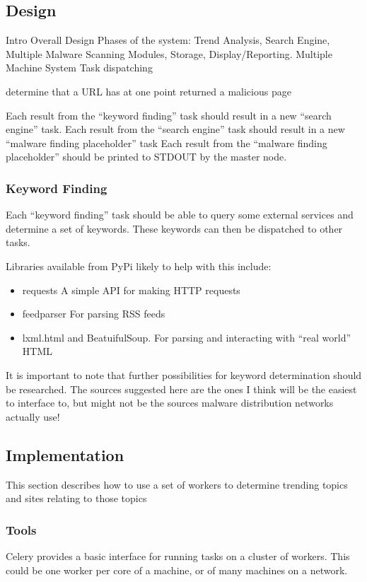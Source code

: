 \subsection{Design}
Intro
Overall Design
Phases of the system:
Trend Analysis, Search Engine, Multiple Malware Scanning Modules, Storage, Display/Reporting.
Multiple Machine System
Task dispatching

determine that a URL has at one point returned a malicious page

Each result from the ``keyword finding'' task should result in a new ``search engine'' task.
Each result from the ``search engine'' task should result in a new ``malware finding placeholder'' task
Each result from the ``malware finding placeholder'' should be printed to STDOUT by the master node.

\subsubsection{Keyword Finding}
Each ``keyword finding'' task should be able to query some external services and determine a set of keywords. These keywords can then be dispatched to other tasks.

Libraries available from PyPi likely to help with this include:

\begin{itemize}
    \item requests A simple API for making HTTP requests
    \item feedparser For parsing RSS feeds
    \item lxml.html and BeatuifulSoup. For parsing and interacting with ``real world'' HTML
\end{itemize}

It is important to note that further possibilities for keyword determination should be researched. The sources suggested here are the ones I think will be the easiest to interface to, but might not be the sources malware distribution networks actually use!

\subsection{Implementation}
This section describes how to use a set of workers to determine trending topics and sites relating to those topics

\subsubsection{Tools}
Celery provides a basic interface for running tasks on a cluster of workers. This could be one worker per core of a machine, or of many machines on a network.

